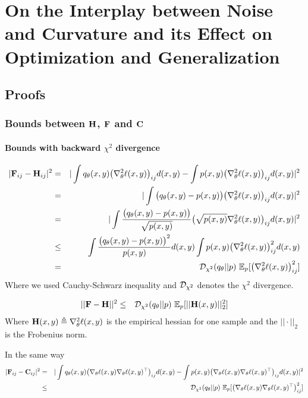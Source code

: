 \chapter{On the Interplay between Noise and Curvature and its Effect on Optimization and Generalization}

\section{Proofs}

\subsection{Bounds between \texorpdfstring{${\mathbf{H}}$}{H}, \texorpdfstring{${\mathbf{F}}$}{F} and \texorpdfstring{${\mathbf{C}}$}{C}}
\label{app:bounds}

\subsubsection{Bounds with backward \texorpdfstring{$\chi^2$}{chi-2} divergence}
\begin{eqnarray*}
|{\mathbf{F}}_{ij} - {\mathbf{H}}_{ij}|^2 &=& |\int q_\theta(x, y) \big(\nabla_\theta^2 \ell(x, y)\big)_{ij} d(x, y) - \int p(x, y) \big(\nabla_\theta^2 \ell(x, y)\big)_{ij} d(x, y)|^2\\
&=& |\int \big(q_\theta(x, y) - p(x, y)\big) \big(\nabla_\theta^2 \ell(x, y)\big)_{ij} d(x, y)|^2\\
&=& |\int \frac{\big(q_\theta(x, y) - p(x, y)\big)}{\sqrt{p(x, y)}} \big(\sqrt{p(x, y)} \nabla_\theta^2 \ell(x, y)\big)_{ij} d(x, y)|^2\\
&\le& \int \frac{\big(q_\theta(x, y) - p(x, y)\big)^2}{p(x, y)} d(x, y) \int p(x, y)  \big(\nabla_\theta^2 \ell(x, y)\big)_{ij}^2 d(x, y)\\
&=& {\mathcal{D}}_{\chi^2}(q_\theta||p) \ \mathbb{E}_p [ \big(\nabla_\theta^2 \ell(x, y)\big)_{ij}^2 ]
\end{eqnarray*}
Where we used Cauchy-Schwarz inequality and ${\mathcal{D}}_{\chi^2}$ denotes the $\chi^2$ divergence.

\begin{eqnarray*}
||{\mathbf{F}} - {\mathbf{H}}||^2 &\le& {\mathcal{D}}_{\chi^2}(q_\theta||p) \ \mathbb{E}_p [ ||{\mathbf{H}}(x, y)||^2_2 ]
\end{eqnarray*}
Where ${\mathbf{H}}(x, y) \triangleq \nabla_\theta^2 \ell(x, y)$ is the empirical hessian for one sample and the $|| \cdot ||_2$ is the Frobenius norm.

In the same way
\begin{eqnarray*}
|{\mathbf{F}}_{ij} - {\mathbf{C}}_{ij}|^2 &=& |\int q_\theta(x, y) \big(\nabla_\theta \ell(x, y) \nabla_\theta \ell(x, y)^\top \big)_{ij} d(x, y) - \int p(x, y) \big(\nabla_\theta \ell(x, y) \nabla_\theta \ell(x, y)^\top \big)_{ij} d(x, y)|^2\\
&\le& {\mathcal{D}}_{\chi^2}(q_\theta||p) \ \mathbb{E}_p [ \big(\nabla_\theta \ell(x, y) \nabla_\theta \ell(x, y)^\top \big)_{ij}^2 ]
\end{eqnarray*}

